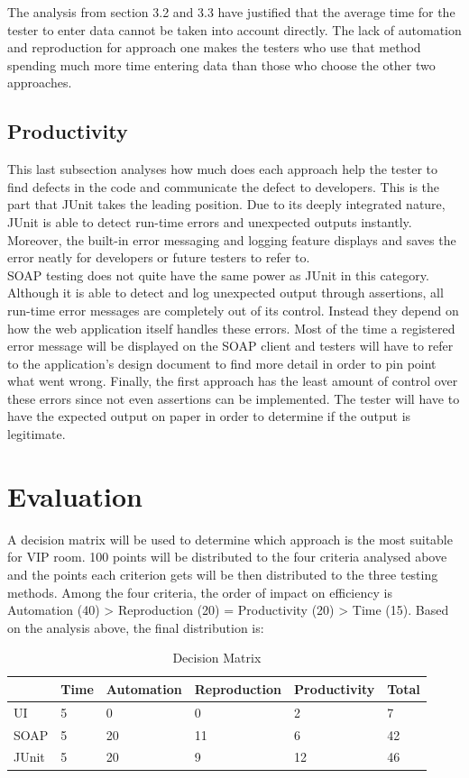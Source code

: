 \documentclass[12pt]{article}
\begin{document}
The analysis from section 3.2 and 3.3 have justified that the average time for the tester to enter data cannot be taken into account directly. The lack of automation and reproduction for approach one makes the testers who use that method spending much more time entering data than those who choose the other two approaches.


\subsection{Productivity}
This last subsection analyses how much does each approach help the tester to find defects in the code and communicate the defect to developers. This is the part that JUnit takes the leading position. Due to its deeply integrated nature, JUnit is able to detect run-time errors and unexpected outputs instantly. Moreover, the built-in error messaging and logging feature displays and saves the error neatly for developers or future testers to refer to.\\
SOAP testing does not quite have the same power as JUnit in this category. Although it is able to detect and log unexpected output through assertions, all run-time error messages are completely out of its control. Instead they depend on how the web application itself handles these errors. Most of the time a registered error message will be displayed on the SOAP client and testers will have to refer to the application's design document to find more detail in order to pin point what went wrong. Finally, the first approach has the least amount of control over these errors since not even assertions can be implemented. The tester will have to have the expected output on paper in order to determine if the output is legitimate.\\
\newpage
\section{Evaluation}
A decision matrix will be used to determine which approach is the most suitable for VIP room. 100 points will be distributed to the four criteria analysed above and the points each criterion gets will be then distributed to the three testing methods. Among the four criteria, the order of impact on efficiency is Automation (40) > Reproduction (20) = Productivity (20) > Time (15). Based on the analysis above, the final distribution is:

\begin{table}[h]\centering
\caption{Decision Matrix}
\label{dm}
\begin{tabular}{|l|l|l|l|l|l|}
\hline
      & Time & Automation & Reproduction & Productivity & Total \\ \hline
UI    & 5    & 0          & 0            & 2            & 7     \\ \hline
SOAP  & 5    & 20         & 11           & 6            & 42    \\ \hline
JUnit & 5    & 20         & 9            & 12           & 46    \\ \hline
\end{tabular}
\end{table}
\end{document}
